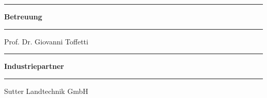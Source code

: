 \begin{titlepage}
\begin{minipage}[b]{0.84\textwidth}
	
	\begin{minipage}[b]{0.27\textwidth}
	\hrule\vskip 0.5cm
		\textbf{Betreuung}\\
	\end{minipage}
	\begin{minipage}[b]{0.03\textwidth}
	\hskip 0.5cm
	\end{minipage}
	\begin{minipage}[b]{0.7\textwidth}
	\hrule\vskip 0.5cm
		Prof. Dr. Giovanni Toffetti \\
	\end{minipage}

	
	
	
	\begin{minipage}[b]{0.27\textwidth}
	\hrule\vskip 0.5cm
		\textbf{Industriepartner}\\
	\end{minipage}
	\begin{minipage}[b]{0.03\textwidth}
	\hskip 0.5cm
	\end{minipage}
	\begin{minipage}[b]{0.7\textwidth}
	\hrule\vskip 0.5cm
		Sutter Landtechnik GmbH \\
	\end{minipage}

	

\end{minipage}
\end{titlepage}
